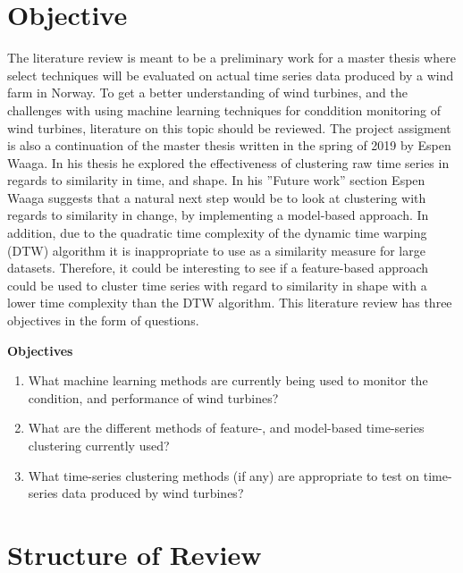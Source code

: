 \section{Objective} \label{sec:objective}

The literature review is meant to be a preliminary work for a master thesis where select techniques will be evaluated on actual time series data produced by a wind farm in Norway. 
To get a better understanding of wind turbines, and the challenges with using machine learning techniques for conddition monitoring of wind turbines, literature on this topic should be reviewed.  
The project assigment is also a continuation of the master thesis written in the spring of 2019 by Espen Waaga. 
In his thesis he explored the effectiveness of clustering raw time series in regards to similarity in time, and shape. 
In his ''Future work'' section Espen Waaga suggests that a natural next step would be to look at clustering with regards to similarity in change, by implementing a model-based approach. 
In addition, due to the quadratic time complexity of the dynamic time warping (DTW) algorithm it is inappropriate to use as a similarity measure for large datasets. 
Therefore, it could be interesting to see if a feature-based approach could be used to cluster time series with regard to similarity in shape with a lower time complexity than the DTW algorithm. 
This literature review has three objectives in the form of questions. \bigskip

\begin{tcolorbox}
    \textbf{Objectives}

    \begin{enumerate}
        \item What machine learning methods are currently being used to monitor the condition, and performance of wind turbines?
        \item What are the different methods of feature-, and model-based time-series clustering currently used?
        \item What time-series clustering methods (if any) are appropriate to test on time-series data produced by wind turbines? 
    \end{enumerate}
\end{tcolorbox}

\section{Structure of Review}
